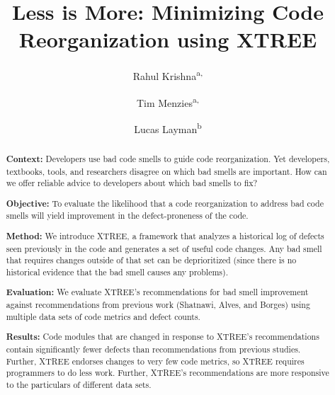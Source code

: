 \documentclass[twocolumn,5p]{elsarticle}
\theoremstyle{break}
\begin{document}
	
	\begin{frontmatter}
		
		\title{Less is More: Minimizing  Code Reorganization using XTREE}
		
		\author{Rahul Krishna\textsuperscript{a,}}
		\author{Tim Menzies\textsuperscript{a,}}
		\author{Lucas Layman\textsuperscript{b}}
		\address{\textsuperscript{a}Department of Computer Science, North 
		Carolina State University, Raleigh, NC, USA\\
			\textsuperscript{b}Fraunhofer CESE, College Park, USA}
		
		\begin{abstract}
			{\bf Context: }
			Developers use bad code smells to guide code reorganization.
			Yet developers, textbooks, tools, and researchers disagree on 
			which bad smells are important. How can we offer reliable
                        advice to developers about which bad smells to fix?
			
			\noindent
			{\bf Objective:} To evaluate the likelihood that a code 
			reorganization to address bad code smells will yield improvement in 
			the defect-proneness of the code.
			
			\noindent
			{\bf Method: } We introduce XTREE, a framework that analyzes a 
			historical log of defects seen previously in the code and generates 
			a set of useful code changes.
			Any bad smell that requires changes outside of that set can be 
			deprioritized (since there is no historical evidence that the bad 
			smell causes any problems).
			
			\noindent
			{\bf Evaluation: } We evaluate XTREE's recommendations for bad 
			smell improvement against recommendations from previous work 
			(Shatnawi, Alves, and Borges) using multiple data sets of code 
			metrics and defect counts.
			
			\noindent
			{\bf Results: }Code modules that are changed in response to XTREE's 
			recommendations contain significantly fewer defects than 
			recommendations from previous studies. Further, XTREE endorses 
			changes to very few code metrics, so XTREE requires programmers to do less
                        work. Further, XTREE's recommendations are more 
                        responsive to the
                        particulars of different data sets.
                        		

\end{abstract}
\end{frontmatter}
\end{document}
